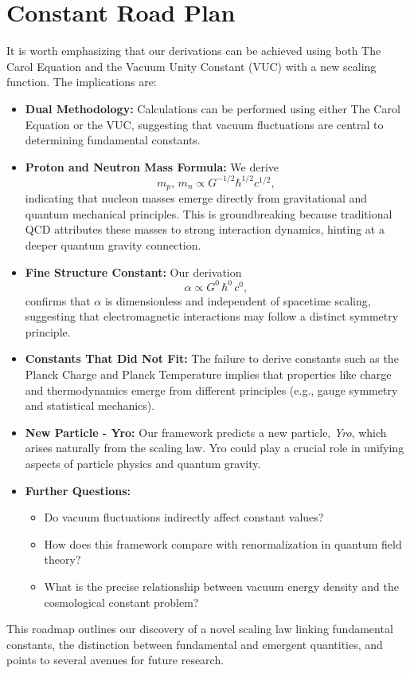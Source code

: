 \documentclass[12pt]{article}
\begin{document}
\section{Constant Road Plan}
It is worth emphasizing that our derivations can be achieved using both The Carol Equation and the Vacuum Unity Constant (VUC) with a new scaling function. The implications are:
\begin{itemize}
    \item \textbf{Dual Methodology:} Calculations can be performed using either The Carol Equation or the VUC, suggesting that vacuum fluctuations are central to determining fundamental constants.
    \item \textbf{Proton and Neutron Mass Formula:} We derive
    \[
    m_p,\, m_n \propto G^{-1/2} \hbar^{1/2} c^{1/2},
    \]
    indicating that nucleon masses emerge directly from gravitational and quantum mechanical principles. This is groundbreaking because traditional QCD attributes these masses to strong interaction dynamics, hinting at a deeper quantum gravity connection.
    \item \textbf{Fine Structure Constant:} Our derivation
    \[
    \alpha \propto G^0\, \hbar^0\, c^0,
    \]
    confirms that \(\alpha\) is dimensionless and independent of spacetime scaling, suggesting that electromagnetic interactions may follow a distinct symmetry principle.
    \item \textbf{Constants That Did Not Fit:} The failure to derive constants such as the Planck Charge and Planck Temperature implies that properties like charge and thermodynamics emerge from different principles (e.g., gauge symmetry and statistical mechanics).
    \item \textbf{New Particle - Yro:} Our framework predicts a new particle, \emph{Yro}, which arises naturally from the scaling law. Yro could play a crucial role in unifying aspects of particle physics and quantum gravity.
    \item \textbf{Further Questions:}
    \begin{itemize}
        \item Do vacuum fluctuations indirectly affect constant values?
        \item How does this framework compare with renormalization in quantum field theory?
        \item What is the precise relationship between vacuum energy density and the cosmological constant problem?
    \end{itemize}
\end{itemize}
This roadmap outlines our discovery of a novel scaling law linking fundamental constants, the distinction between fundamental and emergent quantities, and points to several avenues for future research.
\end{document}
